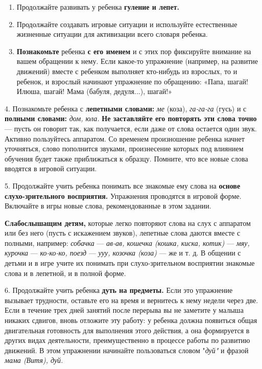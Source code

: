 \documentclass{book}
\renewcommand{\emph}[1]{\textit{#1}}
\begin{document}
\begin{enumerate}
\def\labelenumi{\arabic{enumi}.}
\item
  
  Продолжайте развивать у ребенка \textbf{гуление и лепет.}
  
\item
  
  Продолжайте создавать игровые ситуации и используйте естественные
  жизненные ситуации для активизации всего словаря ребенка.
  
\item
  
  \textbf{Познакомьте} ребенка \textbf{с его именем} и с этих пор
  фиксируйте внимание на вашем обращении к нему. Если какое-то
  упражнение (например, на развитие движений) вместе с ребенком
  выполняет кто-нибудь из взрослых, то и ребенок, и взрослый начинают
  упражнение по обращению: «Папа, шагай! Илюша, шагай! Мама (бабуля,
  дедуля...), шагай!»
  
\end{enumerate}


4. Познакомьте ребенка с \textbf{лепетными словами:} \emph{ме} (коза),
\emph{га-га-га} (гусь) и с \textbf{полными словами:} \emph{дом, юла.}
\textbf{Не заставляйте его повторять эти слова точно} --- пусть он
говорит так, как получается, если даже от слова остается один звук.
Активно пользуйтесь аппаратом. Со временем произношение ребенка начнет
уточняться, слово пополнится звуками, произнесение которых под влиянием
обучения будет также приближаться к образцу. Помните, что все новые
слова вводятся в игровой ситуации.

5. Продолжайте учить ребенка понимать все знакомые ему слова на
\textbf{основе слухо-зрительного восприятия.} Упражнения проводятся в
игровой форме. Включайте в игры новые слова, рекомендованные в этом
задании.

\textbf{Слабослышащим детям,} которые легко повторяют слова на слух с
аппаратом или без него (пусть с искажением звуков), лепетные слова
даются вместе с полными, например: \emph{собачка} --- \emph{ав-ав,
кошечка (кошка, киска, котик)} --- \emph{мяу, курочка} ---
\emph{ко-ко-ко, поезд} --- \emph{ууу, козочка (коза)} --- же и т. д. В
общении с детьми и в игре учите их понимать при слухо-зрительном
восприятии знакомые слова и в лепетной, и в полной форме.

6. Продолжайте учить ребенка \textbf{дуть на предметы.} Если это
упражнение вызывает трудности, оставьте его на время и вернитесь к нему
недели через две. Если в течение трех дней занятий после перерыва вы не
заметите у малыша никаких сдвигов, вновь отложите эту работу: у ребенка
должна появиться общая двигательная готовность для выполнения этого
действия, а она формируется в других видах деятельности, преимущественно
в процессе работы по развитию движений. В этом упражнении начинайте
пользоваться словом "\emph{дуй"} и фразой \emph{мама (Витя), дуй.}
\end{document}
